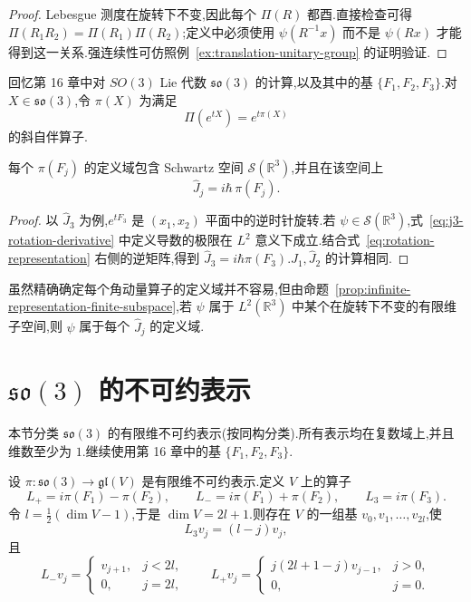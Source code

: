 \begin{proof}
Lebesgue 测度在旋转下不变,因此每个 $\Pi(R)$ 都酉.直接检查可得 $\Pi(R_1R_2)=\Pi(R_1)\Pi(R_2)$;定义中必须使用 $\psi(R^{-1}x)$ 而不是 $\psi(Rx)$ 才能得到这一关系.强连续性可仿照例~\ref{ex:translation-unitary-group} 的证明验证.
\end{proof}

回忆第 16 章中对 $SO(3)$ Lie 代数 $\mathfrak{so}(3)$ 的计算,以及其中的基 $\{F_1,F_2,F_3\}$.对 $X\in\mathfrak{so}(3)$,令 $\pi(X)$ 为满足
\[
\Pi(e^{tX})=e^{t\pi(X)}
\label{eq:rotation-lie-representation}
\]
的斜自伴算子.

\begin{proposition}\label{prop:angular-momentum-lie-action}
每个 $\pi(F_j)$ 的定义域包含 Schwartz 空间 $\mathcal S(\mathbb R^3)$,并且在该空间上
\[
\widehat J_j=i\hbar\,\pi(F_j).
\label{eq:angular-momentum-lie-identification}
\]
\end{proposition}

\begin{proof}
以 $\widehat J_3$ 为例,$e^{tF_3}$ 是 $(x_1,x_2)$ 平面中的逆时针旋转.若 $\psi\in\mathcal S(\mathbb R^3)$,式~\eqref{eq:j3-rotation-derivative} 中定义导数的极限在 $L^2$ 意义下成立.结合式~\eqref{eq:rotation-representation} 右侧的逆矩阵,得到 $\widehat J_3=i\hbar\pi(F_3)$.$\widehat J_1,\widehat J_2$ 的计算相同.
\end{proof}

虽然精确确定每个角动量算子的定义域并不容易,但由命题~\ref{prop:infinite-representation-finite-subspace},若 $\psi$ 属于 $L^2(\mathbb R^3)$ 中某个在旋转下不变的有限维子空间,则 $\psi$ 属于每个 $\widehat J_j$ 的定义域.

\section{$\mathfrak{so}(3)$ 的不可约表示}
\label{sec:irreducible-so3-representations}

本节分类 $\mathfrak{so}(3)$ 的有限维不可约表示(按同构分类).所有表示均在复数域上,并且维数至少为 $1$.继续使用第 16 章中的基 $\{F_1,F_2,F_3\}$.

\begin{theorem}\label{thm:so3-irreducible-standard-form}
设 $\pi:\mathfrak{so}(3)\to\mathfrak{gl}(V)$ 是有限维不可约表示.定义 $V$ 上的算子
\[
L_+=i\pi(F_1)-\pi(F_2),\qquad
L_-=i\pi(F_1)+\pi(F_2),\qquad
L_3=i\pi(F_3).
\]
令 $l=\frac12(\dim V-1)$,于是 $\dim V=2l+1$.则存在 $V$ 的一组基 $v_0,v_1,\ldots,v_{2l}$,使
\[
L_3v_j=(l-j)v_j,
\]
且
\[
L_-v_j=
\begin{cases}v_{j+1},&j<2l,\\0,&j=2l,\end{cases}
\qquad
L_+v_j=
\begin{cases}j(2l+1-j)v_{j-1},&j>0,\\0,&j=0.
\end{cases}
\label{eq:so3-irreducible-action}
\]
\end{theorem}

